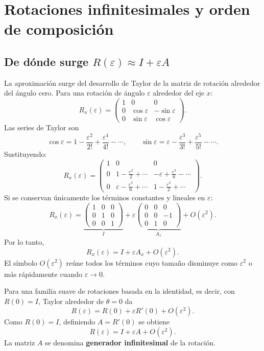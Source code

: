 \section{Rotaciones infinitesimales y orden de composición}\label{ap:infinitesimales}

\subsection{De dónde surge \(R(\varepsilon)\approx I+\varepsilon A\)}

La aproximación surge del desarrollo de Taylor de la matriz de rotación alrededor del ángulo
cero. Para una rotación de ángulo \(\varepsilon\) alrededor del eje \(x\):
\[
R_x(\varepsilon)=
\begin{pmatrix}
1&0&0\\
0&\cos\varepsilon&-\sin\varepsilon\\
0&\sin\varepsilon& \cos\varepsilon
\end{pmatrix}.
\]
Las series de Taylor son
\[
\cos\varepsilon
=1-\frac{\varepsilon^2}{2!}+\frac{\varepsilon^4}{4!}-\cdots,
\qquad
\sin\varepsilon
=\varepsilon-\frac{\varepsilon^3}{3!}+\frac{\varepsilon^5}{5!}-\cdots.
\]
Sustituyendo:
\[
R_x(\varepsilon)=
\begin{pmatrix}
1&0&0\\
0&1-\frac{\varepsilon^2}{2}+\cdots&
-\varepsilon+\frac{\varepsilon^3}{6}-\cdots\\
0&\varepsilon-\frac{\varepsilon^3}{6}+\cdots&
1-\frac{\varepsilon^2}{2}+\cdots
\end{pmatrix}.
\]
Si se conservan únicamente los términos constantes y lineales en \(\varepsilon\):
\[
R_x(\varepsilon)
=
\underbrace{
\begin{pmatrix}
1&0&0\\0&1&0\\0&0&1
\end{pmatrix}}_{I}
+
\varepsilon
\underbrace{
\begin{pmatrix}
0&0&0\\0&0&-1\\0&1&0
\end{pmatrix}}_{A_x}
+O(\varepsilon^2).
\]
Por lo tanto,
\[
\boxed{R_x(\varepsilon)=I+\varepsilon A_x+O(\varepsilon^2)}.
\]
El símbolo \(O(\varepsilon^2)\) reúne todos los términos cuyo tamaño disminuye como
\(\varepsilon^2\) o más rápidamente cuando \(\varepsilon\to0\).

\begin{resultado}
Para una familia suave de rotaciones basada en la identidad, es decir, con \(R(0)=I\), Taylor
alrededor de \(\theta=0\) da
\[
R(\varepsilon)=R(0)+\varepsilon R'(0)+O(\varepsilon^2).
\]
Como \(R(0)=I\), definiendo \(A=R'(0)\) se obtiene
\[
\boxed{R(\varepsilon)=I+\varepsilon A+O(\varepsilon^2)}.
\]
La matriz \(A\) se denomina \textbf{generador infinitesimal} de la rotación.
\end{resultado}

